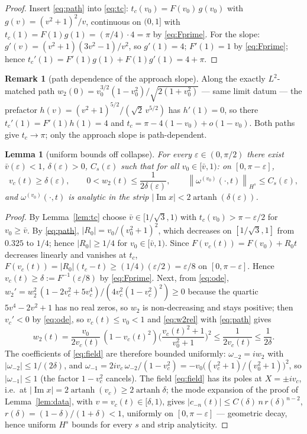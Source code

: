 \documentclass[11pt,a4paper]{article}
\theoremstyle{plain}
\newtheorem{lemma}{Lemma}
\theoremstyle{definition}
\newtheorem*{remark}{Remark}
\theoremstyle{plain}
\newcommand{\norm}[1]{\left\lVert #1 \right\rVert}
\newcommand{\abs}[1]{\lvert #1 \rvert}
\DeclareMathOperator{\artanh}{artanh}
\DeclareMathOperator{\Imag}{Im}
\begin{document}
\begin{proof}
Insert \eqref{eq:path} into \eqref{eq:tc}: $t_c(v_0)=F(v_0)\,g(v_0)$ with $g(v)=(v^2+1)^2/v$, continuous on $(0,1]$ with $t_c(1)=F(1)g(1)=(\pi/4)\cdot4=\pi$ by \eqref{eq:Fprime}. For the slope: $g'(v)=(v^2+1)(3v^2-1)/v^2$, so $g'(1)=4$; $F'(1)=1$ by \eqref{eq:Fprime}; hence $t_c'(1)=F'(1)g(1)+F(1)g'(1)=4+\pi$.
\end{proof}

\begin{remark}[path dependence of the approach slope]
Along the exactly $L^2$-matched path $w_2(0)=v_0^{3/2}(1-v_0^2)/\sqrt{2(1+v_0^2)}$ --- same limit datum --- the prefactor $h(v)=(v^2+1)^{5/2}/(\sqrt2\,v^{5/2})$ has $h'(1)=0$, so there $t_c'(1)=F'(1)h(1)=4$ and $t_c=\pi-4(1-v_0)+o(1-v_0)$. Both paths give $t_c\to\pi$; only the approach slope is path-dependent.
\end{remark}

\begin{lemma}[uniform bounds off collapse]\label{lem:bounds}
For every $\varepsilon\in(0,\pi/2)$ there exist $\bar v(\varepsilon)<1$, $\delta(\varepsilon)>0$, $C_s(\varepsilon)$ such that for all $v_0\in[\bar v,1)$: on $[0,\pi-\varepsilon]$,
\[
v_c(t)\ge\delta(\varepsilon),\qquad 0<w_2(t)\le\frac{1}{2\delta(\varepsilon)},\qquad \norm{\omega^{(v_0)}(\cdot,t)}_{H^s}\le C_s(\varepsilon),
\]
and $\omega^{(v_0)}(\cdot,t)$ is analytic in the strip $\abs{\Imag x}<2\artanh(\delta(\varepsilon))$.
\end{lemma}

\begin{proof}
By Lemma~\ref{lem:tc} choose $\bar v\in[1/\sqrt3,1)$ with $t_c(v_0)>\pi-\varepsilon/2$ for $v_0\ge\bar v$. By \eqref{eq:path}, $\abs{R_0}=v_0/(v_0^2+1)^2$, which decreases on $[1/\sqrt3,1]$ from $0.325$ to $1/4$; hence $\abs{R_0}\ge1/4$ for $v_0\in[\bar v,1)$. Since $F(v_c(t))=F(v_0)+R_0t$ decreases linearly and vanishes at $t_c$, $F(v_c(t))=\abs{R_0}(t_c-t)\ge(1/4)(\varepsilon/2)=\varepsilon/8$ on $[0,\pi-\varepsilon]$. Hence $v_c(t)\ge\delta:=F^{-1}(\varepsilon/8)$ by \eqref{eq:Fprime}. Next, from \eqref{eq:ode}, $w_2'=w_2^2\,(1-2v_c^2+5v_c^4)/(4v_c^2(1-v_c^2)^2)\ge0$ because the quartic $5v^4-2v^2+1$ has no real zeros, so $w_2$ is non-decreasing and stays positive; then $v_c'<0$ by \eqref{eq:ode}, so $v_c(t)\le v_0<1$ and \eqref{eq:w2rel} with \eqref{eq:path} gives
\[
w_2(t)=\frac{v_0}{2v_c(t)}\,(1-v_c(t)^2)\Big(\frac{v_c(t)^2+1}{v_0^2+1}\Big)^2\le\frac{1}{2v_c(t)}\le\frac{1}{2\delta}.
\]
The coefficients of \eqref{eq:field} are therefore bounded uniformly: $\omega_{-2}=iw_2$ with $\abs{\omega_{-2}}\le1/(2\delta)$, and $\omega_{-1}=2iv_c\,\omega_{-2}/(1-v_c^2)=-v_0\big((v_c^2+1)/(v_0^2+1)\big)^2$, so $\abs{\omega_{-1}}\le1$ (the factor $1-v_c^2$ cancels). The field \eqref{eq:field} has its poles at $X=\pm iv_c$, i.e.\ at $\abs{\Imag x}=2\artanh(v_c)\ge2\artanh\delta$; the mode expansion of the proof of Lemma~\ref{lem:data}, with $v=v_c(t)\in[\delta,1)$, gives $\abs{c_{-n}(t)}\le C(\delta)\,n\,r(\delta)^{n-2}$, $r(\delta)=(1-\delta)/(1+\delta)<1$, uniformly on $[0,\pi-\varepsilon]$ --- geometric decay, hence uniform $H^s$ bounds for every $s$ and strip analyticity.
\end{proof}
\end{document}
